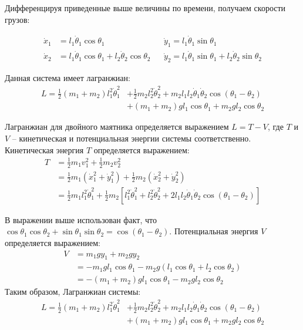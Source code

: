 \documentclass[12pt]{article}
\begin{document}
	Дифференцируя приведенные выше величины по времени, получаем скорости грузов:
	
	$$
	\begin{aligned}
	\dot{x}_{1} &=l_{1} \dot{\theta}_{1} \cos \theta_{1} & & \dot{y}_{1}=l_{1} \dot{\theta}_{1} \sin \theta_{1} \\
	\dot{x}_{2} &=l_{1} \dot{\theta}_{1} \cos \theta_{1}+l_{2} \dot{\theta}_{2} \cos \theta_{2} & & \dot{y}_{2}=l_{1} \dot{\theta}_{1} \sin \theta_{1}+l_{2} \dot{\theta}_{2} \sin \theta_{2}
	\end{aligned}
	$$
	
	Данная система имеет лагранжиан:
	$$
	\begin{aligned}
	L=\frac{1}{2}\left(m_{1}+m_{2}\right) l_{1}^{2} \dot{\theta}_{1}^{2} &+\frac{1}{2} m_{2} l_{2}^{2} \dot{\theta}_{2}^{2}+m_{2} l_{1} l_{2} \dot{\theta}_{1} \dot{\theta}_{2} \cos \left(\theta_{1}-\theta_{2}\right) \\
	&+\left(m_{1}+m_{2}\right) g l_{1} \cos \theta_{1}+m_{2} g l_{2} \cos \theta_{2}
	\end{aligned}
	$$
	
	Лагранжиан для двойного маятника определяется выражением $L=T - V$, где $T$ и $V$ -- кинетическая и потенциальная энергии системы соответственно. Кинетическая энергия $T$ определяется выражением:
	$$
	\begin{aligned}
	T &=\frac{1}{2} m_{1} v_{1}^{2}+\frac{1}{2} m_{2} v_{2}^{2} \\
	&=\frac{1}{2} m_{1}\left(\dot{x}_{1}^{2}+\dot{y}_{1}^{2}\right)+\frac{1}{2} m_{2}\left(\dot{x}_{2}^{2}+\dot{y}_{2}^{2}\right) \\
	&=\frac{1}{2} m_{1} l_{1}^{2} \dot{\theta}_{1}^{2}+\frac{1}{2} m_{2}\left[l_{1}^{2} \dot{\theta}_{1}^{2}+l_{2}^{2} \dot{\theta}_{2}^{2}+2 l_{1} l_{2} \dot{\theta}_{1} \dot{\theta}_{2} \cos \left(\theta_{1}-\theta_{2}\right)\right]
	\end{aligned}
	$$
	
	В выражении выше использован факт, что $\cos \theta_{1} \cos \theta_{2}+\sin \theta_{1} \sin \theta_{2}=\cos \left(\theta_{1}-\theta_{2}\right)$. Потенциальная энергия $V$ определяется выражением:
	$$
	\begin{aligned}
	V &=m_{1} g y_{1}+m_{2} g y_{2} \\
	&=-m_{1} g l_{1} \cos \theta_{1}-m_{2} g\left(l_{1} \cos \theta_{1}+l_{2} \cos \theta_{2}\right) \\
	&=-\left(m_{1}+m_{2}\right) g l_{1} \cos \theta_{1}-m_{2} g l_{2} \cos \theta_{2}
	\end{aligned}
	$$
	Таким образом, Лагранжиан системы:
	$$
	\begin{aligned}
	L=\frac{1}{2}\left(m_{1}+m_{2}\right) l_{1}^{2} \dot{\theta}_{1}^{2} &+\frac{1}{2} m_{2} l_{2}^{2} \dot{\theta}_{2}^{2}+m_{2} l_{1} l_{2} \dot{\theta}_{1} \dot{\theta}_{2} \cos \left(\theta_{1}-\theta_{2}\right) \\
	&+\left(m_{1}+m_{2}\right) g l_{1} \cos \theta_{1}+m_{2} g l_{2} \cos \theta_{2}
	\end{aligned}
	$$
	
\end{document}
